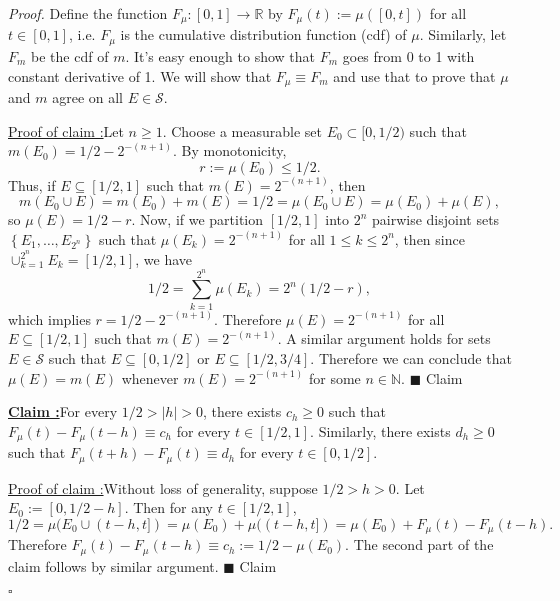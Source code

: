 \documentclass[12pt]{article}
\newcounter{ProofCounter}
\newcounter{ClaimCounter}[ProofCounter]
\newenvironment{Proof}{\stepcounter{ProofCounter}\textit{Proof.}}{\hfill$\square$}
\newenvironment{claim}[1]{\vspace{1mm}\stepcounter{ClaimCounter}\par\noindent\underline{\bf Claim \theClaimCounter:}\space#1}{}
\newenvironment{claimproof}[1]{\par\noindent\underline{Proof of claim \theClaimCounter:}\space#1}{\hfill $\blacksquare$ Claim \theClaimCounter}
\begin{document}
\begin{Proof}
Define the function $F_{\mu} : [0,1] \rightarrow \mathbb{R}$ by $F_{\mu}(t) := \mu([0,t])$ for all $t \in [0,1]$, i.e. $F_{\mu}$ is the 
cumulative distribution function (cdf) of $\mu$. Similarly, let $F_{m}$ be the cdf of $m$. It's easy enough to show that $F_{m}$ goes from 0 to 1 with
constant derivative of 1. We will show that $F_{\mu} \equiv F_{m}$ and use that to prove that $\mu$ and $m$ agree on all $E \in \mathcal{S}$.

\begin{claimproof}
Let $n \geq 1$. Choose a measurable set $E_{0} \subset [0,1/2)$ such that $m(E_{0}) = 1/2 - 2^{-(n+1)}$. By monotonicity,
\[ r := \mu(E_{0}) \leq 1/2. \]
Thus, if $E \subseteq [1/2,1]$ such that $m(E) = 2^{-(n+1)}$, then 
\[ m(E_{0} \cup E) = m(E_{0}) + m(E) = 1/2 = \mu(E_{0} \cup E) = \mu(E_{0}) + \mu(E), \] 
so $\mu(E) = 1/2 - r$. Now, if we partition $[1/2,1]$ into $2^{n}$ pairwise disjoint sets $\left\{ E_{1}, \hdots , E_{2^{n}} \right\}$ such that
$\mu(E_{k}) = 2^{-(n+1)}$ for all $1 \leq k \leq 2^{n}$, then since $\cup_{k=1}^{2^{n}}E_{k} = [1/2,1]$, we have 
\[ 1/2 = \sum_{k=1}^{2^{n}}\mu(E_{k}) = 2^{n}(1/2 - r), \]
which implies $r = 1/2 - 2^{-(n+1)}$. Therefore $\mu(E) = 2^{-(n+1)}$ for all $E \subseteq [1/2,1]$ such that $m(E) = 2^{-(n+1)}$. A similar argument
holds for sets $E \in \mathcal{S}$ such that $E \subseteq [0,1/2]$ or $E \subseteq [1/2,3/4]$. Therefore we can conclude that $\mu(E) = m(E)$ whenever
$m(E) = 2^{-(n+1)}$ for some $n \in \mathbb{N}$.
\end{claimproof}

\begin{claim}
For every $1/2 > |h|  > 0$, there exists $c_{h} \geq 0$ such that $F_{\mu}(t) - F_{\mu}(t - h) \equiv c_{h}$ for every $t \in
[1/2,1]$. Similarly, there exists $d_{h} \geq 0$ such that $F_{\mu}(t+h) - F_{\mu}(t) \equiv d_{h}$ for every $t \in [0,1/2]$.
\end{claim}
\begin{claimproof}
Without loss of generality, suppose $1/2 > h > 0$. 
Let $E_{0} := [0, 1/2 - h]$. Then for any $t \in [1/2,1]$,
\[ 1/2 = \mu(E_{0} \cup (t-h, t]) = \mu(E_{0}) + \mu( (t-h, t]) = \mu(E_{0}) + F_{\mu}(t) - F_{\mu}(t-h). \]
Therefore $F_{\mu}(t) - F_{\mu}(t-h) \equiv c_{h} := 1/2 - \mu(E_{0})$. The second part of the claim follows by similar argument.
\end{claimproof}


\end{Proof}
\end{document}

